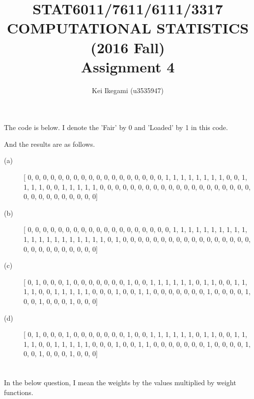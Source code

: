 \documentclass{article}
\begin{document}
\title{STAT6011/7611/6111/3317 \\ 
COMPUTATIONAL STATISTICS (2016 Fall) \\
Assignment 4}
\author{Kei Ikegami (u3535947)}
\maketitle

\section{}
The code is below. I denote the 'Fair' by 0 and 'Loaded' by 1 in this code.
	
And the results are as follows.
\begin{description}
	\item[(a)] [ 0,  0,  0,  0,  0,  0,  0,  0,  0,  0,  0,  0,  0,
      	0,  0,  0,  0,  0,  1,  1,  1,  1,  1,  1,  1,  1,
        0,  0,  1,  1,  1,  1,  0,  0,  1,  1,  1,  1,  1,
        0,  0,  0,  0,  0,  0,  0,  0,  0,  0,  0,  0,  0,
        0,  0,  0,  0,  0,  0,  0,  0,  0,  0,  0,  0,  0,
        0,  0,  0,  0]
	\item[(b)] [ 0,  0,  0,  0,  0,  0,  0,  0,  0,  0,  0,  0,  0,
        0,  0,  0,  0,  0,  0,  1,  1,  1,  1,  1,  1,  1,
        1,  1,  1,  1,  1,  1,  1,  1,  1,  1,  1,  1,  1,
        1,  0,  1,  0,  0,  0,  0,  0,  0,  0,  0,  0,  0,
        0,  0,  0,  0,  0,  0,  0,  0,  0,  0,  0,  0,  0,
        0,  0,  0,  0]
	\item[(c)] [ 0,  1,  0,  0,  0,  1,  0,  0,  0,  0,  0,  0,  0,
        1,  0,  0,  1,  1,  1,  1,  1,  1,  0,  1,  1,  0,
        0,  1,  1,  1,  1,  0,  0,  1,  1,  1,  1,  1,  0,
        0,  0,  1,  0,  0,  1,  1,  0,  0,  0,  0,  0,  0,
        0,  1,  0,  0,  0,  0,  1,  0,  0,  1,  0,  0,  0,
        1,  0,  0,  0]
	\item[(d)] [ 0,  1,  0,  0,  0,  1,  0,  0,  0,  0,  0,  0,  0,
        1,  0,  0,  1,  1,  1,  1,  1,  1,  0,  1,  1,  0,
        0,  1,  1,  1,  1,  0,  0,  1,  1,  1,  1,  1,  0,
        0,  0,  1,  0,  0,  1,  1,  0,  0,  0,  0,  0,  0,
        0,  1,  0,  0,  0,  0,  1,  0,  0,  1,  0,  0,  0,
        1,  0,  0,  0]
\end{description}
\section{}
	
	In the below question, I mean the weights by the values multiplied by weight functions.
\end{document}
